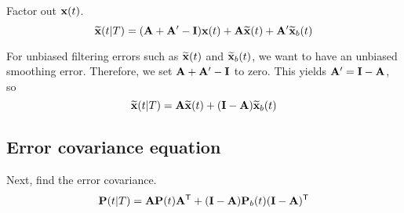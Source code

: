 Factor out $\mathbf{x}(t)$.
\begin{equation*}
  \widetilde{\mathbf{x}}(t|T) = (\mathbf{A} + \mathbf{A}' - \mathbf{I})\mathbf{x}(t) +
    \mathbf{A}\widetilde{\mathbf{x}}(t) + \mathbf{A}'\widetilde{\mathbf{x}}_b(t)
\end{equation*}

For unbiased filtering errors such as $\widetilde{\mathbf{x}}(t)$ and
$\widetilde{\mathbf{x}}_b(t)$, we want to have an unbiased smoothing error.
Therefore, we set $\mathbf{A} + \mathbf{A}' - \mathbf{I}$ to zero. This yields
$\mathbf{A}' = \mathbf{I} - \mathbf{A}$, so
\begin{equation*}
  \widetilde{\mathbf{x}}(t|T) = \mathbf{A}\widetilde{\mathbf{x}}(t) +
    (\mathbf{I} - \mathbf{A})\widetilde{\mathbf{x}}_b(t)
\end{equation*}

\subsection{Error covariance equation}

Next, find the error covariance.
\begin{equation}
  \mathbf{P}(t|T) = \mathbf{A}\mathbf{P}(t)\mathbf{A}^\mathsf{T} +
    (\mathbf{I} - \mathbf{A})\mathbf{P}_b(t)(\mathbf{I} - \mathbf{A})^\mathsf{T}
    \label{eq:ks_error_cov_a}
\end{equation}

